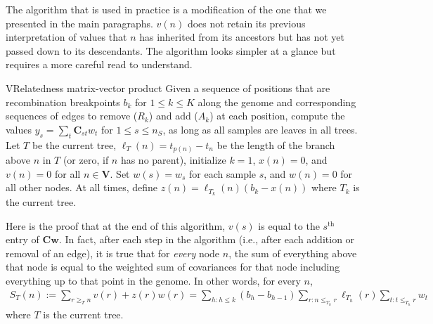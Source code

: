 The algorithm that is used in practice is a modification of the one that we presented in the main paragraphs.
$v(n)$ does not retain its previous interpretation of values that $n$ has inherited from its ancestors
but has not yet passed down to its descendants.
The algorithm looks simpler at a glance but requires a more careful read to understand.

\begin{taocpalg}{V}{Relatedness matrix-vector product}
{
    Given a sequence of positions that are recombination breakpoints $b_k$ for $1 \le k \le K$ along the genome and corresponding sequences of edges to remove ($R_k$) and add ($A_k$) at each position, 
    compute the values 
    $y_s=\sum_t\mathbf{C}_{st} w_t$ for $1 \le s \le n_S$, as long as all samples are leaves in all trees.
    Let $T$ be the current tree,
    $\ell_T(n) = t_{p(n)} - t_n$ be the length of the branch above $n$ in $T$ (or zero, if $n$ has no parent),
    initialize $k = 1$, $x(n) = 0$, and $v(n) = 0$ for all $n \in \mathbf{V}$.
    Set $w(s) = w_s$ for each sample $s$, and $w(n)=0$ for all other nodes.
    At all times, define 
    $z(n) = \ell_{T_k}(n) (b_k - x(n)) $ where $T_k$ is the current tree.
}




\end{taocpalg}

Here is the proof that at the end of this algorithm, $v(s)$ is equal to the $s^{\text{th}}$ entry of $\mathbf{C}\mathbf{w}$.
In fact, after each step in the algorithm (i.e., after each addition or removal of an edge), it is true that for \textit{every} node $n$, the sum of everything above that node is equal to the weighted sum of covariances
for that node including everything up to that point in the genome.
In other words, for every $n$,
\begin{align} \label{eqn:matvec_consistent}
    S_T(n):=
    \sum_{r \ge_T n} v(r) + z(r)w(r) 
    = 
    \sum_{h:h \le k} (b_h-b_{h-1}) \sum_{r:n \le_{T_h} r} \ell_{T_h}(r) \sum_{t: t \le_{T_h} r} w_t
\end{align}
where $T$ is the current tree.

